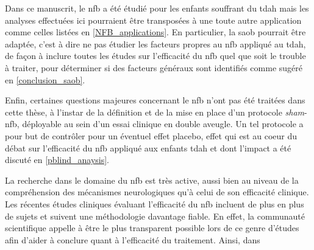Dans ce manuscrit, le \gls{nfb} a été étudié pour les enfants souffrant du \gls{tdah} mais les analyses effectuées ici pourraient être 
transposées à une toute autre application comme celles listées en \ref{NFB_applications}.
En particulier, la \gls{saob} pourrait être adaptée, c'est à dire ne pas étudier les facteurs propres au \gls{nfb} 
appliqué au \gls{tdah}, de façon à inclure toutes les études sur l'efficacité du \gls{nfb} 
quel que soit le trouble à traiter, pour déterminer si des facteurs généraux sont identifiés comme sugéré en \ref{conclusion_saob}. 

Enfin, certaines questions majeures concernant le \gls{nfb} n'ont pas été traitées dans cette thèse,
à l'instar de la définition et de la mise en place d'un protocole \textit{sham}-\gls{nfb}, déployable au sein d'un essai clinique en double aveugle. Un tel protocole 
a pour but de contrôler pour un éventuel effet placebo, effet qui est au coeur du débat sur l'efficacité du \gls{nfb} appliqué aux enfants \gls{tdah} et dont l'impact
a été discuté en \ref{pblind_anaysis}. 

La recherche dans le domaine du \gls{nfb} est très active, aussi bien au niveau de la compréhension des mécanismes neurologiques qu'à celui de son efficacité clinique.
Les récentes études cliniques évaluant l'efficacité du \gls{nfb} incluent de plus en plus de sujets et suivent une méthodologie davantage fiable. En effet,
la communauté scientifique appelle à être le plus transparent possible lors de ce genre d'études afin d'aider à conclure quant à l'efficacité du traitement. 
Ainsi, dans 


%


